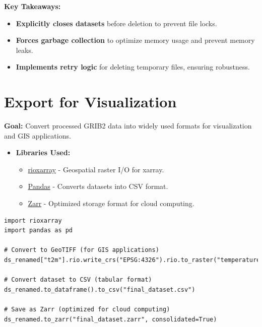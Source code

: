 \documentclass[a4paper,10pt]{article}
\begin{document}
\textbf{Key Takeaways:}
\begin{itemize}
    \item \textbf{Explicitly closes datasets} before deletion to prevent file locks.
    \item \textbf{Forces garbage collection} to optimize memory usage and prevent memory leaks.
    \item \textbf{Implements retry logic} for deleting temporary files, ensuring robustness.
\end{itemize}

\section{Export for Visualization}
\textbf{Goal:} Convert processed GRIB2 data into widely used formats for visualization and GIS applications.

\begin{itemize}
    \item \textbf{Libraries Used:}
    \begin{itemize}
        \item \href{https://corteva.github.io/rioxarray/stable/}{rioxarray} - Geospatial raster I/O for xarray.
        \item \href{https://pandas.pydata.org/}{Pandas} - Converts datasets into CSV format.
        \item \href{https://zarr.readthedocs.io/en/stable/}{Zarr} - Optimized storage format for cloud computing.
    \end{itemize}
\end{itemize}

\begin{verbatim}
import rioxarray
import pandas as pd

# Convert to GeoTIFF (for GIS applications)
ds_renamed["t2m"].rio.write_crs("EPSG:4326").rio.to_raster("temperature_2m.tif")

# Convert dataset to CSV (tabular format)
ds_renamed.to_dataframe().to_csv("final_dataset.csv")

# Save as Zarr (optimized for cloud computing)
ds_renamed.to_zarr("final_dataset.zarr", consolidated=True)
\end{verbatim}
\end{document}
